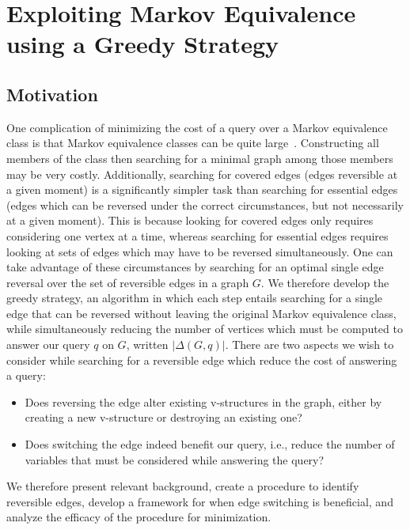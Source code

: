 \chapter{Exploiting Markov Equivalence using a Greedy Strategy}

\section{Motivation}

\null \quad \quad One complication of minimizing the cost of a query over a Markov equivalence class is that Markov equivalence classes can be quite large~\cite{MECsize1, MECsize2}. Constructing all members of the class then searching for a minimal graph among those members may be very costly. \newline
\null \quad \quad Additionally, searching for covered edges (edges reversible at a given moment) is a significantly simpler task than searching for essential edges (edges which can be reversed under the correct circumstances, but not necessarily at a given moment). This is because looking for covered edges only requires considering one vertex at a time, whereas searching for essential edges requires looking at sets of edges which may have to be reversed simultaneously. One can take advantage of these circumstances by searching for an optimal single edge reversal over the set of reversible edges in a graph $G$. \newline
\null \quad \quad We therefore develop the greedy strategy, an algorithm in which each step entails searching for a single edge that can be reversed without leaving the original Markov equivalence class, while simultaneously reducing the number of vertices which must be computed to answer our query $q$ on $G$, written $|\Delta(G,q)|$. \newline
\null \quad \quad There are two aspects we wish to consider while searching for a reversible edge which reduce the cost of answering a query:
	\begin{itemize}
	\item Does reversing the edge alter existing v-structures in the graph, either by creating a new v-structure or destroying an existing one? 
	\item Does switching the edge indeed benefit our query, i.e., reduce the number of variables that must be considered while answering the query?
	\end{itemize}
We therefore present relevant background, create a procedure to identify reversible edges, develop a framework for when edge switching is beneficial, and analyze the efficacy of the procedure for minimization. 

